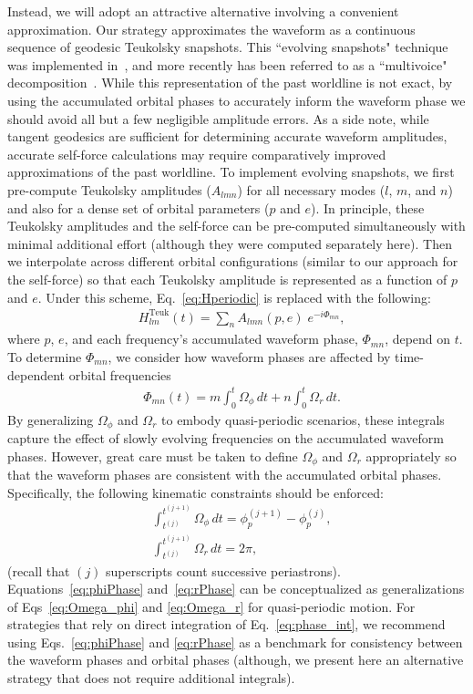 \documentclass[aps,prd,twocolumn,showpacs,notitlepage,eqsecnum,
superscriptaddress,nofootinbib]{revtex4-1}
\begin{document}
Instead, we will adopt an attractive alternative involving a convenient approximation. Our strategy approximates the waveform as a continuous sequence of geodesic Teukolsky snapshots. This ``evolving snapshots" technique was implemented in~\cite{WarbOsbu17}, and more recently has been referred to as a ``multivoice" decomposition~\cite{Hughes_2021}. While this representation of the past worldline is not exact, by using the accumulated orbital phases to accurately inform the waveform phase we should avoid all but a few negligible amplitude errors. As a side note, while tangent geodesics are sufficient for determining accurate waveform amplitudes, accurate self-force calculations may require comparatively improved approximations of the past worldline. To implement evolving snapshots, we first pre-compute Teukolsky amplitudes ($A_{lmn}$) for all necessary modes ($l$, $m$, and $n$) and also for a dense set of orbital parameters ($p$ and $e$). In principle, these Teukolsky amplitudes and the self-force can be pre-computed simultaneously with minimal additional effort (although they were computed separately here). Then we interpolate across different orbital configurations (similar to our approach for the self-force) so that each Teukolsky amplitude is represented as a function of $p$ and $e$. Under this scheme, Eq.~\eqref{eq:Hperiodic} is replaced with the following:
\begin{align}
\label{eq:Hcont}
& H^\text{Teuk}_{lm}(t) = \sum_n A_{lmn}(p,e) \; e^{-i \Phi_{mn}} ,
\end{align}
where $p$, $e$, and each frequency's accumulated waveform phase, $\Phi_{mn}$, depend on $t$. To determine $\Phi_{mn}$, we consider how waveform phases are affected by time-dependent orbital frequencies
\begin{align}
\label{eq:phase_int}
&\Phi_{mn}(t) = m \int_0^t \Omega_\phi \, dt + n \int_0^t \Omega_r \, dt.
\end{align}
By generalizing $\Omega_\phi$ and $\Omega_r$ to embody quasi-periodic scenarios, these integrals capture the effect of slowly evolving frequencies on the accumulated waveform phases. However, great care must be taken to define $\Omega_\phi$ and $\Omega_r$ appropriately so that the waveform phases are consistent with the accumulated orbital phases. Specifically, the following kinematic constraints should be enforced:
\begin{align}
\label{eq:phiPhase}
&\int_{t^{(j)}}^{t^{(j+1)}} \Omega_\phi \, dt = \phi^{(j+1)}_p-\phi^{(j)}_p ,
\\
\label{eq:rPhase}
&\int_{t^{(j)}}^{t^{(j+1)}} \Omega_r \, dt = 2 \pi ,
\end{align}
(recall that $(j)$ superscripts count successive periastrons). Equations~\eqref{eq:phiPhase} and~\eqref{eq:rPhase} can be conceptualized as generalizations of Eqs~\eqref{eq:Omega_phi} and \eqref{eq:Omega_r} for quasi-periodic motion. For strategies that rely on direct integration of Eq.~\eqref{eq:phase_int}, we recommend using Eqs.~\eqref{eq:phiPhase} and \eqref{eq:rPhase} as a benchmark for consistency between the waveform phases and orbital phases (although, we present here an alternative strategy that does not require additional integrals).
\end{document}
